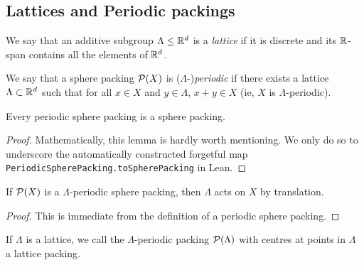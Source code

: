 \subsection{Lattices and Periodic packings}

\begin{definition}\label{IsZlattice}\leanok
  We say that an additive subgroup $\Lambda \leq \mathbb{R}^d$ is a \emph{lattice} if it is discrete and its $\mathbb{R}$-span contains all the elements of $\mathbb{R}^d$.
\end{definition}

\begin{definition}\label{PeriodicSpherePacking}\leanok
  We say that a sphere packing $\mathcal{P}(X)$ is ($\Lambda$-)\emph{periodic} if there exists a lattice $\Lambda \subset \mathbb{R}^d$ such that for all $x \in X$ and $y \in \Lambda$, $x + y \in X$ (ie, $X$ is $\Lambda$-periodic).
\end{definition}

\begin{lemma}\label{PeriodicSpherePacking.toSpherePacking}\leanok
  Every periodic sphere packing is a sphere packing.
\end{lemma}
\begin{proof}
  Mathematically, this lemma is hardly worth mentioning. We only do so to underscore the automatically constructed forgetful map \verb|PeriodicSpherePacking.toSpherePacking| in Lean.
\end{proof}

\begin{lemma}\label{PeriodicSpherePacking.instAddAction}\leanok
  If $\mathcal{P}(X)$ is a $\Lambda$-periodic sphere packing, then $\Lambda$ acts on $X$ by translation.
\end{lemma}
\begin{proof}\leanok
  This is immediate from the definition of a periodic sphere packing.
\end{proof}

\begin{definition}
  If $\Lambda$ is a lattice, we call the $\Lambda$-periodic packing $\mathcal{P}(\Lambda)$ with centres at points in $\Lambda$ a lattice packing.
\end{definition}

